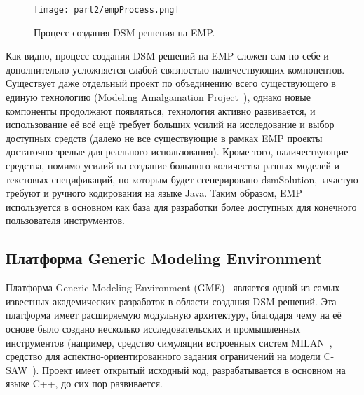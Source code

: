 \begin{figure} [ht]
	\begin{center}
		\texttt{[image: part2/empProcess.png]}
		\caption{Процесс создания DSM-решения на EMP.}
		\label{empProcess}
	\end{center}
\end{figure}

Как видно, процесс создания \ac{DSM}-решений на EMP сложен сам по себе и дополнительно 
усложняется слабой связностью наличествующих компонентов. Существует даже отдельный 
проект по объединению всего существующего в единую технологию (Modeling Amalgamation Project~\cite{amalgam}), 
однако новые компоненты продолжают появляться, технология активно развивается, и использование 
её всё ещё требует больших усилий на исследование и выбор доступных средств (далеко 
не все существующие в рамках EMP проекты достаточно зрелые для реального использования). 
Кроме того, наличествующие средства, помимо усилий на создание большого количества 
разных моделей и текстовых спецификаций, по которым будет сгенерировано \ac{dsmSolution}, 
зачастую требуют и ручного кодирования на языке Java. Таким образом, EMP используется 
в основном как база для разработки более доступных для конечного пользователя инструментов.

\subsection{Платформа Generic Modeling Environment}
Платформа Generic Modeling Environment (GME)~\cite{gme, ledeczi2001generic} является 
одной из самых известных академических разработок в области создания \ac{DSM}-решений. 
Эта платформа имеет расширяемую модульную архитектуру, благодаря чему на её основе было создано 
несколько исследовательских и промышленных инструментов (например, средство симуляции встроенных 
систем MILAN~\cite{milan}, средство для аспектно-ориентированного задания ограничений на модели 
C-SAW~\cite{csaw}). Проект имеет открытый исходный код, разрабатывается в основном на языке C++, до сих пор развивается.

